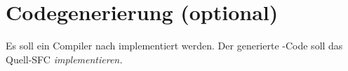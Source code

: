 \section{Codegenerierung (optional)}
\label{sec:codegenerierung}

Es soll ein Compiler nach \Java{} implementiert werden.  Der generierte
\Java-Code soll das Quell-SFC \emph{implementieren.}


